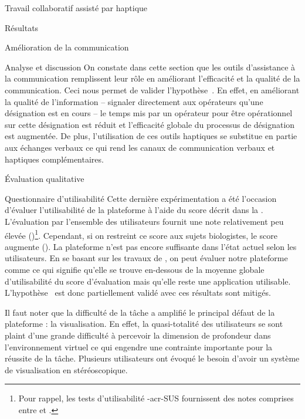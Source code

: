 \documentclass[myfrancais,ngerman,english,frenchb]{mythesis}
\begin{document}
\begin{mychapter}{Travail collaboratif assisté par haptique}
\begin{mysection}{Résultats}
\begin{mysubsection}{Amélioration de la communication}
\begin{mysubsubsection}{Analyse et discussion}
					On constate dans cette section que les outils d'assistance à la communication remplissent leur rôle en améliorant l'efficacité et la qualité de la communication.
					Ceci nous permet de valider l'hypothèse~.
					En effet, en améliorant la qualité de l'information -- signaler directement aux opérateurs qu'une désignation est en cours -- le temps mis par un opérateur pour être opérationnel sur cette désignation est réduit et l'efficacité globale du processus de désignation est augmentée.
					De plus, l'utilisation de ces outils haptiques se substitue en partie aux échanges verbaux ce qui rend les canaux de communication verbaux et haptiques complémentaires.
				\end{mysubsubsection}
			\end{mysubsection}
			\begin{mysubsection}{Évaluation qualitative}
				\begin{mysubsubsection}{Questionnaire d'utilisabilité}
					Cette dernière expérimentation a été l'occasion d'évaluer l'utilisabilité de la plateforme \myShaddock à l'aide du score  décrit dans la .
					L'évaluation par l'ensemble des utilisateurs fournit une note relativement peu élevée ()\footnote{Pour rappel, les tests d'utilisabilité \myacronl-{acr-SUS} fournissent des notes comprises entre  et .}.
					Cependant, si on restreint ce score aux sujets biologistes, le score augmente ().
					La plateforme n'est pas encore suffisante dans l'état actuel selon les utilisateurs.
					En se basant sur les travaux de , on peut évaluer notre plateforme comme \og {} \fg ce qui signifie qu'elle se trouve en-dessous de la moyenne globale d'utilisabilité du score d'évaluation  mais qu'elle reste une application utilisable.
					L'hypothèse~ est donc partiellement validé avec ces résultats sont mitigés.

					Il faut noter que la difficulté de la tâche a amplifié le principal défaut de la plateforme : la visualisation.
					En effet, la quasi-totalité des utilisateurs se sont plaint d'une grande difficulté à percevoir la dimension de profondeur dans l'environnement virtuel ce qui engendre une contrainte importante pour la réussite de la tâche.
					Plusieurs utilisateurs ont évoqué le besoin d'avoir un système de visualisation en \myThreeD stéréoscopique.


\end{mysubsubsection}
\end{mysubsection}
\end{mysection}
\end{mychapter}
\end{document}
